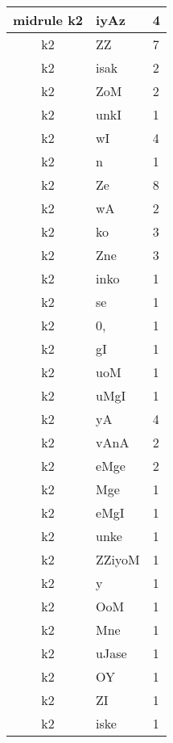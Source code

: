 \documentclass[a4 paper]{article}
\begin{document}
\begin{longtable}{cp{}p{}}
midrule k2 & iyAz & 4\\ \midrule k2 & ZZ & 7\\ \midrule k2 & isak & 2\\ \midrule k2 & ZoM & 2\\ \midrule k2 & unkI & 1\\ \midrule k2 & wI & 4\\ \midrule k2 & n & 1\\ \midrule k2 & Ze & 8\\ \midrule k2 & wA & 2\\ \midrule k2 & ko & 3\\ \midrule k2 & Zne & 3\\ \midrule k2 & inko & 1\\ \midrule k2 & se & 1\\ \midrule k2 & 0, & 1\\ \midrule k2 & gI & 1\\ \midrule k2 & uoM & 1\\ \midrule k2 & uMgI & 1\\ \midrule k2 & yA & 4\\ \midrule k2 & vAnA & 2\\ \midrule k2 & eMge & 2\\ \midrule k2 & Mge & 1\\ \midrule k2 & eMgI & 1\\ \midrule k2 & unke & 1\\ \midrule k2 & ZZiyoM & 1\\ \midrule k2 & y & 1\\ \midrule k2 & OoM & 1\\ \midrule k2 & Mne & 1\\ \midrule k2 & uJase & 1\\ \midrule k2 & OY & 1\\ \midrule k2 & ZI & 1\\ \midrule k2 & iske & 1\\ \midrule 

\end{longtable}
\end{document}
